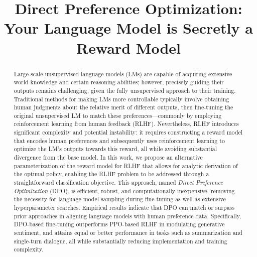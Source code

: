 \title{Direct Preference Optimization: Your Language Model is Secretly a Reward Model}

\begin{abstract}
Large-scale unsupervised language models (LMs) are capable of acquiring extensive world knowledge and certain reasoning abilities; however, precisely guiding their outputs remains challenging, given the fully unsupervised approach to their training. Traditional methods for making LMs more controllable typically involve obtaining human judgments about the relative merit of different outputs, then fine-tuning the original unsupervised LM to match these preferences—commonly by employing reinforcement learning from human feedback (RLHF). Nevertheless, RLHF introduces significant complexity and potential instability: it requires constructing a reward model that encodes human preferences and subsequently uses reinforcement learning to optimize the LM’s outputs towards this reward, all while avoiding substantial divergence from the base model. In this work, we propose an alternative parameterization of the reward model for RLHF that allows for analytic derivation of the optimal policy, enabling the RLHF problem to be addressed through a straightforward classification objective. This approach, named \textit{Direct Preference Optimization} (DPO), is efficient, robust, and computationally inexpensive, removing the necessity for language model sampling during fine-tuning as well as extensive hyperparameter searches. Empirical results indicate that DPO can match or surpass prior approaches in aligning language models with human preference data. Specifically, DPO-based fine-tuning outperforms PPO-based RLHF in modulating generative sentiment, and attains equal or better performance in tasks such as summarization and single-turn dialogue, all while substantially reducing implementation and training complexity.
\end{abstract}

